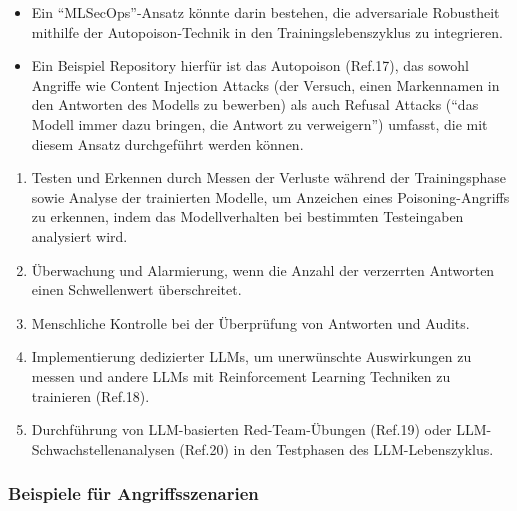 \documentclass[
]{article}
\providecommand{\tightlist}{%
  \setlength{\itemsep}{0pt}\setlength{\parskip}{0pt}}
\begin{document}
\begin{itemize}
\tightlist
\item
  Ein ``MLSecOps''-Ansatz könnte darin bestehen, die adversariale
  Robustheit mithilfe der Autopoison-Technik in den
  Trainingslebenszyklus zu integrieren.
\item
  Ein Beispiel Repository hierfür ist das Autopoison (Ref.17), das
  sowohl Angriffe wie Content Injection Attacks (der Versuch, einen
  Markennamen in den Antworten des Modells zu bewerben) als auch Refusal
  Attacks (``das Modell immer dazu bringen, die Antwort zu verweigern'')
  umfasst, die mit diesem Ansatz durchgeführt werden können.
\end{itemize}

\begin{enumerate}
\def\labelenumi{\arabic{enumi}.}
\setcounter{enumi}{9}
\tightlist
\item
  Testen und Erkennen durch Messen der Verluste während der
  Trainingsphase sowie Analyse der trainierten Modelle, um Anzeichen
  eines Poisoning-Angriffs zu erkennen, indem das Modellverhalten bei
  bestimmten Testeingaben analysiert wird.
\item
  Überwachung und Alarmierung, wenn die Anzahl der verzerrten Antworten
  einen Schwellenwert überschreitet.
\item
  Menschliche Kontrolle bei der Überprüfung von Antworten und Audits.
\item
  Implementierung dedizierter LLMs, um unerwünschte Auswirkungen zu
  messen und andere LLMs mit Reinforcement Learning Techniken zu
  trainieren (Ref.18).
\item
  Durchführung von LLM-basierten Red-Team-Übungen (Ref.19) oder
  LLM-Schwachstellenanalysen (Ref.20) in den Testphasen des
  LLM-Lebenszyklus.
\end{enumerate}

\subsubsection{Beispiele für
Angriffsszenarien}\label{beispiele-fuxfcr-angriffsszenarien}
\end{document}
